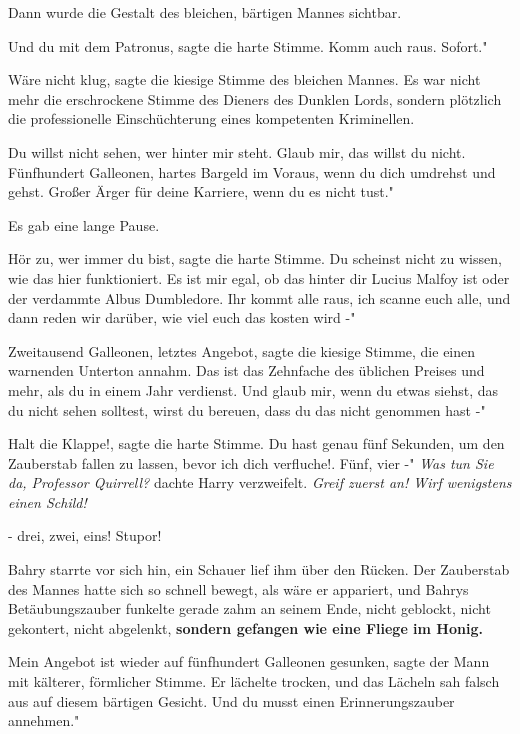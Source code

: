 Dann wurde die Gestalt des bleichen, bärtigen Mannes sichtbar.

\glqq Und du mit dem Patronus\grqq{}, sagte die harte Stimme. \glqq Komm auch
raus. Sofort."

\glqq Wäre nicht klug\grqq{}, sagte die kiesige Stimme des bleichen Mannes. Es
war nicht mehr die erschrockene Stimme des Dieners des Dunklen Lords, sondern
plötzlich die professionelle Einschüchterung eines kompetenten Kriminellen.

\glqq Du willst nicht sehen, wer hinter mir steht. Glaub mir, das willst du
nicht. Fünfhundert Galleonen, hartes Bargeld im Voraus, wenn du dich umdrehst
und gehst. Großer Ärger für deine Karriere, wenn du es nicht tust."

Es gab eine lange Pause.

\glqq Hör zu, wer immer du bist\grqq{}, sagte die harte Stimme. \glqq Du
scheinst nicht zu wissen, wie das hier funktioniert. Es ist mir egal, ob das
hinter dir Lucius Malfoy ist oder der verdammte Albus Dumbledore. Ihr kommt alle
raus, ich scanne euch alle, und dann reden wir darüber, wie viel euch das kosten
wird -"

\glqq Zweitausend Galleonen, letztes Angebot\grqq{}, sagte die kiesige Stimme,
die einen warnenden Unterton annahm. \glqq Das ist das Zehnfache des üblichen
Preises und mehr, als du in einem Jahr verdienst. Und glaub mir, wenn du etwas
siehst, das du nicht sehen solltest, wirst du bereuen, dass du das nicht
genommen hast -"

\glqq Halt die Klappe!\grqq{}, sagte die harte Stimme. \glqq Du hast genau fünf
Sekunden, um den Zauberstab fallen zu lassen, bevor ich dich verfluche!. Fünf,
vier -" \emph{ Was tun Sie da, Professor Quirrell?} dachte Harry verzweifelt.
\emph{Greif zuerst an! Wirf wenigstens einen Schild!}

\glqq - drei, zwei, eins! Stupor!\grqq{}

Bahry starrte vor sich hin, ein Schauer lief ihm über den Rücken. Der Zauberstab
des Mannes hatte sich so schnell bewegt, als wäre er appariert, und Bahrys
Betäubungszauber funkelte gerade zahm an seinem Ende, nicht geblockt, nicht
gekontert, nicht abgelenkt, \textbf{sondern gefangen wie eine Fliege im Honig.}

\glqq Mein Angebot ist wieder auf fünfhundert Galleonen gesunken\grqq{}, sagte
der Mann mit kälterer, förmlicher Stimme. Er lächelte trocken, und das Lächeln
sah falsch aus auf diesem bärtigen Gesicht. \glqq Und du musst einen
Erinnerungszauber annehmen."

